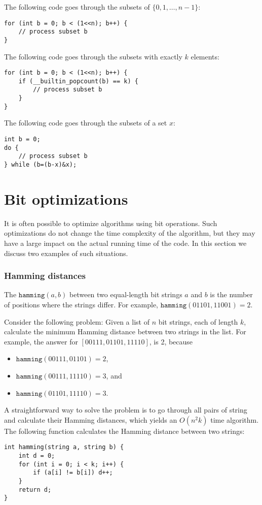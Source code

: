 The following code goes through
the subsets of $\{0,1,\ldots,n-1\}$:

\begin{lstlisting}
for (int b = 0; b < (1<<n); b++) {
    // process subset b
}
\end{lstlisting}
The following code goes through
the subsets with exactly $k$ elements:
\begin{lstlisting}
for (int b = 0; b < (1<<n); b++) {
    if (__builtin_popcount(b) == k) {
        // process subset b
    }
}
\end{lstlisting}
The following code goes through the subsets
of a set $x$:
\begin{lstlisting}
int b = 0;
do {
    // process subset b
} while (b=(b-x)&x);
\end{lstlisting}

\section{Bit optimizations}

It is often possible to optimize algorithms
using bit operations.
Such optimizations do not change the
time complexity of the algorithm,
but they may have a large impact
on the actual running time of the code.
In this section we discuss two examples
of such situations.

\subsubsection{Hamming distances}

The 
$\texttt{hamming}(a,b)$ between two
equal-length bit strings $a$ and $b$ is
the number of positions where the strings differ.
For example, $\texttt{hamming}(01101,11001)=2$.

Consider the following problem: Given
a list of $n$ bit strings, each of length $k$,
calculate the minimum Hamming distance
between two strings in the list.
For example, the answer for $[00111,01101,11110]$,
is 2, because
\begin{itemize}[noitemsep]
\item $\texttt{hamming}(00111,01101)=2$,
\item $\texttt{hamming}(00111,11110)=3$, and
\item $\texttt{hamming}(01101,11110)=3$.
\end{itemize}

A straightforward way to solve the problem is
to go through all pairs of string and calculate
their Hamming distances,
which yields an $O(n^2 k)$ time algorithm.
The following function calculates
the Hamming distance between two strings:
\begin{lstlisting}
int hamming(string a, string b) {
    int d = 0;
    for (int i = 0; i < k; i++) {
        if (a[i] != b[i]) d++;
    }
    return d;
}
\end{lstlisting}


